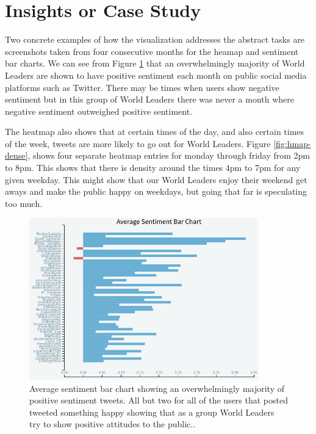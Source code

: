 \documentclass[journal]{vgtc}                %
\begin{document}
\section{Insights or Case Study}

Two concrete examples of how the visualization addresses the abstract tasks are screenshots taken from four consecutive months for the heamap and sentiment bar charts.
We can see from Figure \ref{fig:all-pos} that an overwhelmingly majority of World Leaders are shown to have positive sentiment each month on public social media platforms such as Twitter. 
There may be times when users show negative sentiment but in this group of World Leaders there was never a month where negative sentiment outweighed positive sentiment.

The heatmap also shows that at certain times of the day, and also certain times of the week, tweets are more likely to go out for World Leaders.
Figure \ref{fig:hmap-dense}, shows four separate heatmap entries for monday through friday from 2pm to 8pm.
This shows that there is density around the times 4pm to 7pm for any given weekday.
This might show that our World Leaders enjoy their weekend get aways and make the public happy on weekdays, but going that far is speculating too much.

\begin{figure}[tb]
 \centering %
 \includegraphics[height=7cm,width=\columnwidth, keepaspectratio]{imgs/all-pos.png}
 \caption{Average sentiment bar chart showing an overwhelmingly majority of positive sentiment tweets. All but two for all of the users that posted tweeted something happy showing that as a group World Leaders try to show positive attitudes to the public.. }
 \label{fig:all-pos}
\end{figure}
\end{document}
